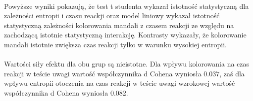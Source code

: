 \documentclass[12pt,a4paper,final,oneside,onecolumn,titlepage]{article}
\begin{document}
\paragraph{}
Powyższe wyniki pokazują, że test t studenta wykazał istotność statystyczną dla zależności entropii i czasu reackji oraz model liniowy wykazał istotność statystyczną zależności kolorowania mandali z czasem reakcji ze względu na zachodzącą istotnie statystyczną interakcję. Kontrasty wykazały, że kolorowanie mandali istotnie zwiększa czas reakcji tylko w warunku wysokiej entropii.
\paragraph{}
Wartości siły efektu dla obu grup są nieistotne. Dla wpływu kolorowania na czas reakcji w teście uwagi wartość współczynnika d Cohena wyniosła $0.037$, zaś dla wpływu entropii otoczenia na czas reakcji w teście uwagi wzrokowej wartość współczynnika d Cohena wyniosła $0.082$.
\end{document}
